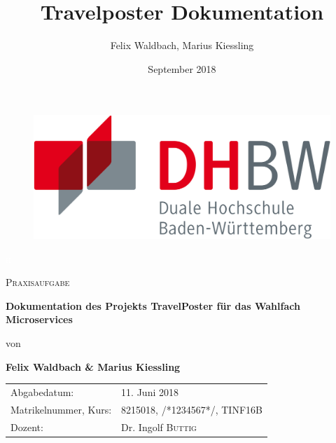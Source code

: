 \documentclass[12pt,a4paper]{report}
\author{Felix Waldbach, Marius Kiessling}
\title{Travelposter Dokumentation}
\date{September 2018}
\begin{document}


\begin{titlepage}
	\centering

\begin{figure}
\begin{minipage}[hbt]{5cm}
	\centering
	\includegraphics[scale=0.1]{Bilder_Doku/DHBW-Logo.png}	
\end{minipage}
\end{figure}
\newlength{\drop}
	\textheight 
	\centering	

	\textcolor{white}{\scshape\Large h}\par		
	\vspace{1cm}
	{\scshape\Large Praxisaufgabe\par}	
	\vspace{1cm}
	{\huge\bfseries Dokumentation des Projekts TravelPoster für das Wahlfach Microservices \par}
	\vspace{1cm}
	{\Large von\par}
	{\Large\bfseries Felix Waldbach \& Marius Kiessling\par}
	\vfill
	\vspace{3cm}
	{\scshape\Large \par}

	\begin{tabular}{ll}
		Abgabedatum: & 11. Juni 2018 \\		
		Matrikelnummer, Kurs: & 8215018, /*1234567*/, TINF16B \\ 
		Dozent: & 
		Dr. Ingolf \textsc{Buttig}\\ 
 
	\end{tabular}	
	
	\vfill

	
\end{titlepage}
\end{document}
